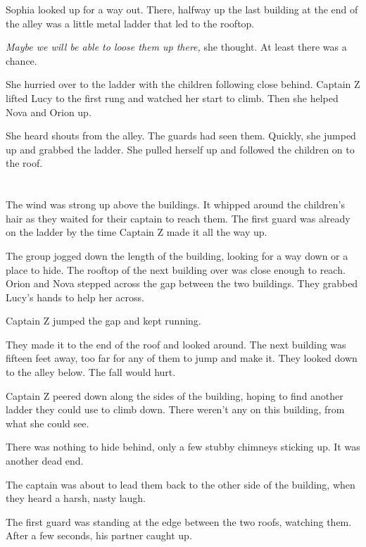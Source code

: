 \documentclass[12pt]{extbook}
\begin{document}
  Sophia looked up for a way out. There, halfway up the last building at
  the end of the alley was a little metal ladder that led to the rooftop.
  
  \emph{Maybe we will be able to loose them up there,} she thought. At
  least there was a chance.
  
  She hurried over to the ladder with the children following close behind.
  Captain Z lifted Lucy to the first rung and watched her start to climb.
  Then she helped Nova and Orion up.
  
  She heard shouts from the alley. The guards had seen them. Quickly, she
  jumped up and grabbed the ladder. She pulled herself up and followed the
  children on to the roof.
  
  \section{}\label{section-33}
  
  The wind was strong up above the buildings. It whipped around the
  children's hair as they waited for their captain to reach them. The
  first guard was already on the ladder by the time Captain Z made it all
  the way up.
  
  The group jogged down the length of the building, looking for a way down
  or a place to hide. The rooftop of the next building over was close
  enough to reach. Orion and Nova stepped across the gap between the two
  buildings. They grabbed Lucy's hands to help her across.
  
  Captain Z jumped the gap and kept running.
  
  They made it to the end of the roof and looked around. The next building
  was fifteen feet away, too far for any of them to jump and make it. They
  looked down to the alley below. The fall would hurt.
  
  Captain Z peered down along the sides of the building, hoping to find
  another ladder they could use to climb down. There weren't any on this
  building, from what she could see.
  
  There was nothing to hide behind, only a few stubby chimneys sticking
  up. It was another dead end.
  
  The captain was about to lead them back to the other side of the
  building, when they heard a harsh, nasty laugh.
  
  The first guard was standing at the edge between the two roofs, watching
  them. After a few seconds, his partner caught up.
  
\end{document}
